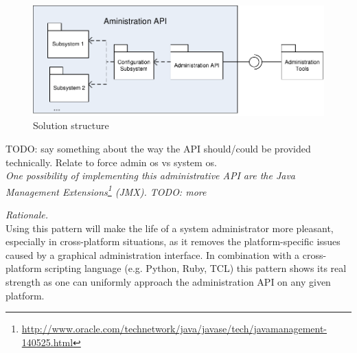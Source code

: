 \begin{figure}[h]
\centering
\includegraphics{patterns/provideAPIDiagram-01.pdf}
\caption{Solution structure}
\label{fig:provideAPIDiagram-01}
\end{figure}

TODO: say something about the way the API should/could be provided technically. Relate to force admin os vs system os.\\

\textit{One possibility of implementing this administrative API are the Java Management Extensions\footnote{\url{http://www.oracle.com/technetwork/java/javase/tech/javamanagement-140525.html}} (JMX). TODO: more }

\begin{center}
   
\end{center}

\textit{Rationale.}\\
Using this pattern will make the life of a system administrator more pleasant, especially in cross-platform situations, as it removes the platform-specific issues caused by a graphical administration interface. In combination with a cross-platform scripting language (e.g. Python, Ruby, TCL) this pattern shows its real strength as one can uniformly approach the administration API on any given platform.


